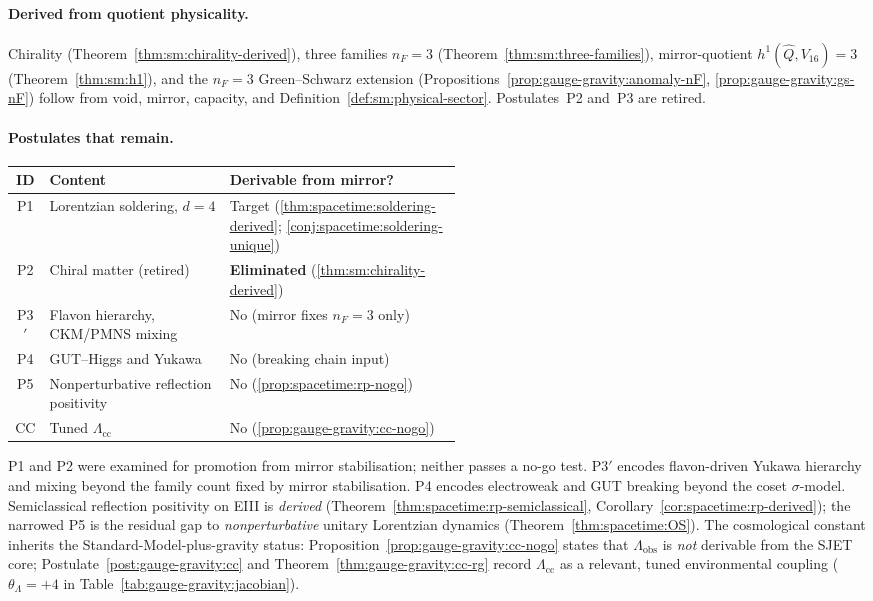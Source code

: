 \paragraph{Derived from quotient physicality.}
Chirality (Theorem~\ref{thm:sm:chirality-derived}), three families
$n_F=3$ (Theorem~\ref{thm:sm:three-families}), mirror-quotient
$h^1(\hat Q,V_{16})=3$ (Theorem~\ref{thm:sm:h1}), and the $n_F=3$
Green--Schwarz extension (Propositions~\ref{prop:gauge-gravity:anomaly-nF},
\ref{prop:gauge-gravity:gs-nF}) follow from void, mirror, capacity, and
Definition~\ref{def:sm:physical-sector}. Postulates~P2 and~P3 are retired.

\paragraph{Postulates that remain.}
\begin{center}
\small
\renewcommand{\arraystretch}{1.1}
\begin{tabular}{@{}clp{0.52\linewidth}@{}}
\toprule
\textbf{ID} & \textbf{Content} & \textbf{Derivable from mirror?} \\
\midrule
P1 & Lorentzian soldering, $d=4$ & Target
  (\ref{thm:spacetime:soldering-derived}; \ref{conj:spacetime:soldering-unique}) \\
P2 & Chiral matter (retired) & \textbf{Eliminated}
  (\ref{thm:sm:chirality-derived}) \\
P3$'$ & Flavon hierarchy, CKM/PMNS mixing & No (mirror fixes $n_F=3$ only) \\
P4 & GUT--Higgs and Yukawa & No (breaking chain input) \\
P5 & Nonperturbative reflection positivity & No (\ref{prop:spacetime:rp-nogo}) \\
CC & Tuned $\Lambda_{\mathrm{cc}}$ & No (\ref{prop:gauge-gravity:cc-nogo}) \\
\bottomrule
\end{tabular}
\end{center}
\noindent
P1 and P2 were examined for promotion from mirror stabilisation; neither
passes a no-go test. P3$'$ encodes flavon-driven Yukawa hierarchy and mixing beyond the family
count fixed by mirror stabilisation. P4 encodes electroweak and GUT breaking
beyond the coset $\sigma$-model. Semiclassical reflection positivity on EIII is
\emph{derived} (Theorem~\ref{thm:spacetime:rp-semiclassical},
Corollary~\ref{cor:spacetime:rp-derived}); the narrowed P5 is the residual
gap to \emph{nonperturbative} unitary Lorentzian dynamics
(Theorem~\ref{thm:spacetime:OS}). The cosmological constant inherits the
Standard-Model-plus-gravity status: Proposition~\ref{prop:gauge-gravity:cc-nogo}
states that $\Lambda_{\mathrm{obs}}$ is \emph{not} derivable from the SJET
core; Postulate~\ref{post:gauge-gravity:cc} and
Theorem~\ref{thm:gauge-gravity:cc-rg} record $\Lambda_{\mathrm{cc}}$ as a
relevant, tuned environmental coupling ($\theta_{\Lambda}=+4$ in
Table~\ref{tab:gauge-gravity:jacobian}).

